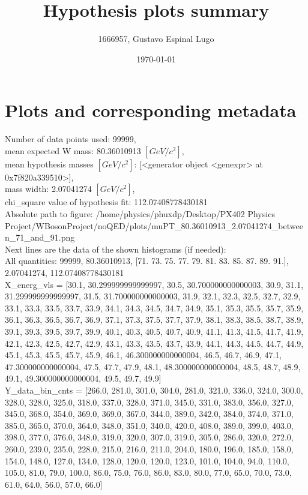 \documentclass[12pt]{article}
\begin{document}
	\title{Hypothesis plots summary} %
	\author{1666957, Gustavo Espinal Lugo}
	\date{\today} %

	\maketitle
	
	\section*{Plots and corresponding metadata}
	Number of data points used: 99999,\\
mean expected W mass: 80.36010913 $[GeV/c^{2}]$,\\
mean hypothesis masses $[GeV/c^{2}]$: [<generator object <genexpr> at 0x7f820a339510>],\\
mass width: 2.07041274 $[GeV/c^{2}]$,\\
chi\_square value of hypothesis fit: 112.07408778430181\\
	Absolute path to figure: /home/physics/phuxdp/Desktop/PX402 Physics Project/WBosonProject/noQED/plots/muPT\_80.36010913\_2.07041274\_between\_71\_and\_91.png\\
	Next lines are the data of the shown histograms (if needed): \\
	All quantities: 	99999, 80.36010913, [71. 73. 75. 77. 79. 81. 83. 85. 87. 89. 91.], 2.07041274, 112.07408778430181\\
	X\_energ\_vls = [30.1, 30.299999999999997, 30.5, 30.700000000000003, 30.9, 31.1, 31.299999999999997, 31.5, 31.700000000000003, 31.9, 32.1, 32.3, 32.5, 32.7, 32.9, 33.1, 33.3, 33.5, 33.7, 33.9, 34.1, 34.3, 34.5, 34.7, 34.9, 35.1, 35.3, 35.5, 35.7, 35.9, 36.1, 36.3, 36.5, 36.7, 36.9, 37.1, 37.3, 37.5, 37.7, 37.9, 38.1, 38.3, 38.5, 38.7, 38.9, 39.1, 39.3, 39.5, 39.7, 39.9, 40.1, 40.3, 40.5, 40.7, 40.9, 41.1, 41.3, 41.5, 41.7, 41.9, 42.1, 42.3, 42.5, 42.7, 42.9, 43.1, 43.3, 43.5, 43.7, 43.9, 44.1, 44.3, 44.5, 44.7, 44.9, 45.1, 45.3, 45.5, 45.7, 45.9, 46.1, 46.300000000000004, 46.5, 46.7, 46.9, 47.1, 47.300000000000004, 47.5, 47.7, 47.9, 48.1, 48.300000000000004, 48.5, 48.7, 48.9, 49.1, 49.300000000000004, 49.5, 49.7, 49.9]\\
	Y\_data\_bin\_cnts = [266.0, 281.0, 301.0, 304.0, 281.0, 321.0, 336.0, 324.0, 300.0, 328.0, 328.0, 325.0, 318.0, 337.0, 328.0, 371.0, 345.0, 331.0, 383.0, 356.0, 327.0, 345.0, 368.0, 354.0, 369.0, 369.0, 367.0, 344.0, 389.0, 342.0, 384.0, 374.0, 371.0, 385.0, 365.0, 370.0, 364.0, 348.0, 351.0, 340.0, 420.0, 408.0, 389.0, 399.0, 403.0, 398.0, 377.0, 376.0, 348.0, 319.0, 320.0, 307.0, 319.0, 305.0, 286.0, 320.0, 272.0, 260.0, 239.0, 235.0, 228.0, 215.0, 216.0, 211.0, 204.0, 180.0, 196.0, 185.0, 158.0, 154.0, 148.0, 127.0, 134.0, 128.0, 120.0, 120.0, 123.0, 101.0, 104.0, 94.0, 110.0, 105.0, 81.0, 79.0, 100.0, 86.0, 75.0, 76.0, 86.0, 83.0, 80.0, 77.0, 65.0, 70.0, 73.0, 61.0, 64.0, 56.0, 57.0, 66.0]\\
\end{document}
